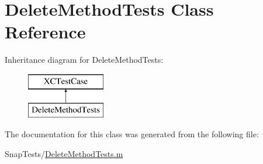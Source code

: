 \hypertarget{interface_delete_method_tests}{}\section{Delete\+Method\+Tests Class Reference}
\label{interface_delete_method_tests}
Inheritance diagram for Delete\+Method\+Tests\+:\begin{figure}[H]
\begin{center}
\leavevmode
\includegraphics[height=2.000000cm]{interface_delete_method_tests}
\end{center}
\end{figure}


The documentation for this class was generated from the following file\+:\begin{DoxyCompactItemize}
\item 
Snap\+Tests/\hyperlink{_delete_method_tests_8m}{Delete\+Method\+Tests.\+m}\end{DoxyCompactItemize}
